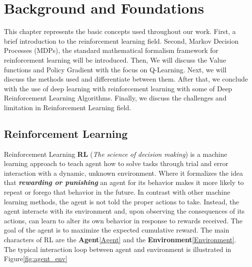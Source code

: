 
\chapter{Background and Foundations}\label{chapter:background_and_foundations}

This chapter represents the basic concepts used throughout our work. First, a brief introduction to the reinforcement learning field. Second, Markov Decision Processes (MDPs), the standard mathematical formalism framework for reinforcement learning will be introduced. Then, We will discuss the Value functions and Policy Gradient with the focus on Q-Learning. Next, we will discuss the methods used and differentiate between them. After that, we conclude with the use of deep learning with reinforcement learning with some of Deep Reinforcement Learning Algorithms. Finally, we discuss the challenges and limitation in Reinforcement Learning field.

\section{Reinforcement Learning}
Reinforcement Learning \textbf{RL} (\textit{The science of decision making}) is a machine learning approach to teach agent how to solve tasks through trial and error interaction with a dynamic, unknown environment. Where it formalizes the idea that \textit{\textbf{rewarding or punishing}} an agent for its behavior makes it more likely to repeat or forego that behavior in the future. In contrast with other machine learning methods, the agent is not told the proper actions to take. Instead, the agent interacts with its environment and, upon observing the consequences of its actions, can learn to alter its own behavior in response to rewards received. The goal of the agent is to maximize the expected cumulative reward. The main characters of RL are the \textbf{Agent}\ref{Agent} and the \textbf{Environment}\ref{Environment}. 
The typical interaction loop between agent and environment is illustrated in Figure\ref{fig:agent_env}

